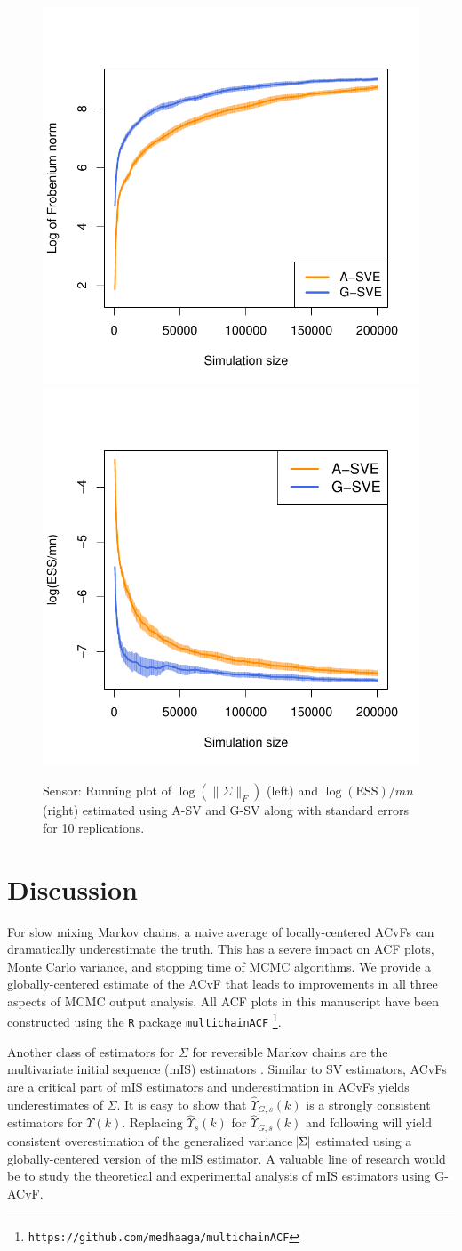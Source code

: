 \documentclass[12pt]{article}
\theoremstyle{remark}
\begin{document}
\begin{figure}[htbp]
    \centering
      \includegraphics[width = .30\textwidth]{plots/sensor-frob.pdf} 
      \includegraphics[width = .30\textwidth]{plots/sensor-ess.pdf}

    \caption{Sensor: Running plot of $\log (\|{\Sigma}\|_F)$ (left) and $\log ({\textrm{ESS}})/mn$ (right) estimated using A-SV and G-SV along with standard errors for 10 replications.}
    \label{fig:sensor-frob_n_ess}
\end{figure}
 
\section{Discussion} \label{sec:discussion}



For slow mixing Markov chains, a naive average of locally-centered ACvFs can dramatically underestimate the truth. This has a severe impact on ACF plots, Monte Carlo variance, and stopping time of MCMC algorithms. We provide a globally-centered estimate of the ACvF that leads to improvements in all three aspects of MCMC output analysis. All ACF plots in this manuscript have been constructed using the \texttt{R} package \texttt{multichainACF} \footnote{\texttt{https://github.com/medhaaga/multichainACF}}.

%

Another class of estimators for $\Sigma$ for reversible Markov chains are the multivariate initial sequence (mIS) estimators \citep{dai:jon:2017}. Similar to SV estimators, ACvFs are a critical part of mIS estimators and underestimation in ACvFs yields underestimates of $\Sigma$. It is easy to show that $\hat{\Upsilon}_{G,s}(k)$ is a strongly consistent estimators for $\Upsilon(k)$. Replacing $\hat{\Upsilon}_s(k)$ for $\hat{\Upsilon}_{G,s}(k)$ and following \cite[Theorem~2]{dai:jon:2017} will yield consistent overestimation of the generalized variance $\abs{\Sigma}$ estimated using a globally-centered version of the mIS estimator.  A valuable line of research would be to study the theoretical and experimental analysis of mIS estimators using G-ACvF. 
\end{document}
